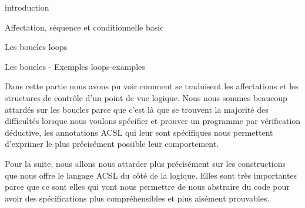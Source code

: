 \begin{levelTwo}
  {}
  {introduction}
\end{levelTwo}


\begin{levelTwo}
  {Affectation, séquence et conditionnelle}
  {basic}
\end{levelTwo}

\begin{levelTwo}
  {Les boucles}
  {loops}
\end{levelTwo}

\begin{levelTwo}
  {Les boucles - Exemples}
  {loops-examples}
\end{levelTwo}



\horizontalLine



Dans cette partie nous avons pu voir comment se traduisent les affectations et
les structures de contrôle d'un point de vue logique. Nous nous sommes beaucoup 
attardés sur les boucles parce que c'est là que se trouvent la majorité des 
difficultés lorsque nous voulons spécifier et prouver un programme par 
vérification déductive, les annotations ACSL qui leur sont spécifiques nous 
permettent d'exprimer le plus précisément possible leur comportement.



Pour la suite, nous allons nous attarder plus précisément sur les constructions
que nous offre le langage ACSL du côté de la logique. Elles sont très 
importantes parce que ce sont elles qui vont nous permettre de nous abstraire
du code pour avoir des spécifications plus compréhensibles et plus aisément 
prouvables.
